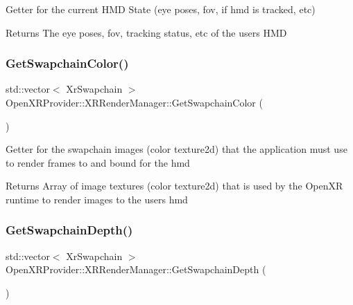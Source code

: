 Getter for the current H\+MD State (eye poses, fov, if hmd is tracked, etc) \begin{DoxyReturn}{Returns}
The eye poses, fov, tracking status, etc of the user\textquotesingle{}s H\+MD 
\end{DoxyReturn}
\mbox{\label{class_open_x_r_provider_1_1_x_r_render_manager_ae97da10203b51fe701ccd57b4299bc9b}} 
\subsubsection{\texorpdfstring{GetSwapchainColor()}{GetSwapchainColor()}}
{\footnotesize\ttfamily std\+::vector$<$ Xr\+Swapchain $>$ Open\+X\+R\+Provider\+::\+X\+R\+Render\+Manager\+::\+Get\+Swapchain\+Color (\begin{DoxyParamCaption}{ }\end{DoxyParamCaption})\hspace{0.3cm}{\ttfamily [inline]}}

Getter for the swapchain images (color texture2d) that the application must use to render frames to and bound for the hmd \begin{DoxyReturn}{Returns}
Array of image textures (color texture2d) that is used by the Open\+XR runtime to render images to the user\textquotesingle{}s hmd 
\end{DoxyReturn}
\mbox{\label{class_open_x_r_provider_1_1_x_r_render_manager_a0835882f612c14539f3226425b398bcb}} 
\subsubsection{\texorpdfstring{GetSwapchainDepth()}{GetSwapchainDepth()}}
{\footnotesize\ttfamily std\+::vector$<$ Xr\+Swapchain $>$ Open\+X\+R\+Provider\+::\+X\+R\+Render\+Manager\+::\+Get\+Swapchain\+Depth (\begin{DoxyParamCaption}{ }\end{DoxyParamCaption})\hspace{0.3cm}{\ttfamily [inline]}}

